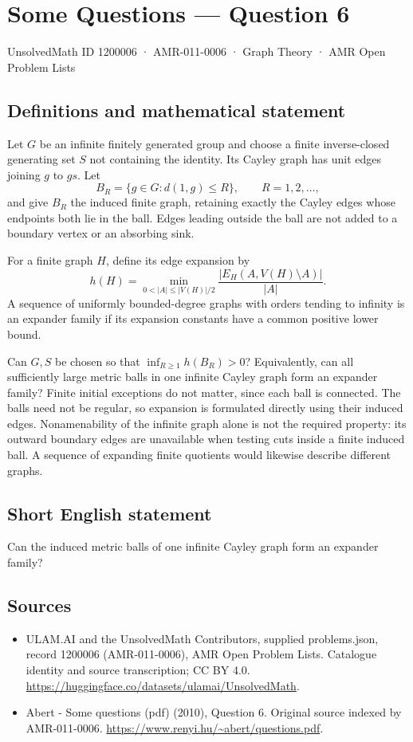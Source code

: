 \documentclass[11pt,a4paper]{article}
\begin{document}
\section*{Some Questions — Question 6}\label{1200006}
{\small UnsolvedMath ID 1200006 · AMR-011-0006 · Graph Theory · AMR Open Problem Lists}
\subsection{Definitions and mathematical statement}
Let $G$ be an infinite finitely generated group and choose a finite inverse-closed generating set $S$ not containing the identity. Its Cayley graph has unit edges joining $g$ to $gs$. Let
\[
 B_R=\{g\in G:d(1,g)\leq R\},\qquad R=1,2,\ldots,
\]
and give $B_R$ the induced finite graph, retaining exactly the Cayley edges whose endpoints both lie in the ball. Edges leading outside the ball are not added to a boundary vertex or an absorbing sink.

For a finite graph $H$, define its edge expansion by
\[
 h(H)=\min_{0<|A|\leq|V(H)|/2}
          \frac{|E_H(A,V(H)\setminus A)|}{|A|}.
\]
A sequence of uniformly bounded-degree graphs with orders tending to infinity is an expander family if its expansion constants have a common positive lower bound.

Can $G,S$ be chosen so that $\inf_{R\geq1}h(B_R)>0$? Equivalently, can all sufficiently large metric balls in one infinite Cayley graph form an expander family? Finite initial exceptions do not matter, since each ball is connected. The balls need not be regular, so expansion is formulated directly using their induced edges. Nonamenability of the infinite graph alone is not the required property: its outward boundary edges are unavailable when testing cuts inside a finite induced ball. A sequence of expanding finite quotients would likewise describe different graphs.
\subsection{Short English statement}
Can the induced metric balls of one infinite Cayley graph form an expander family?
\subsection{Sources}
\begin{itemize}
\item[S1] ULAM.AI and the UnsolvedMath Contributors, supplied problems.json, record 1200006 (AMR-011-0006), AMR Open Problem Lists. Catalogue identity and source transcription; CC BY 4.0.
\url{https://huggingface.co/datasets/ulamai/UnsolvedMath}.
\item[S2] Abert - Some questions (pdf) (2010), Question 6. Original source indexed by AMR-011-0006.
\url{https://www.renyi.hu/~abert/questions.pdf}.
\end{itemize}
\end{document}
